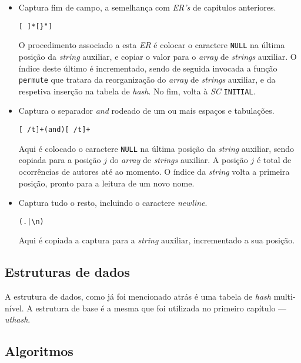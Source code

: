 \begin{itemize}
	\item Captura fim de campo, a semelhança com \emph{ER's} de capítulos
		anteriores.  

\begin{verbatim}
[ ]*[}"] 
\end{verbatim}

O procedimento associado a esta \emph{ER} é colocar o caractere \texttt{NULL}
na última posição da \emph{string} auxiliar, e copiar o valor para
o \emph{array} de \emph{strings} auxiliar. O índice deste último é incrementado,
sendo de seguida invocada a função \texttt{permute} que tratara da reorganização
do \emph{array} de \emph{strings} auxiliar, e da respetiva inserção na tabela de
\emph{hash}. No fim, volta à \emph{SC} \texttt{INITIAL}.  

\item Captura o separador \emph{and} rodeado de um ou mais espaços e tabulações.
\begin{verbatim}
[ /t]+(and)[ /t]+
\end{verbatim}

Aqui é colocado o caractere \texttt{NULL}  na última posição da \emph{string}
auxiliar, sendo copiada para a posição $j$ do \emph{array} de \emph{strings}
auxiliar.  A posição $j$ é total de ocorrências de autores até ao momento.
O índice da \emph{string} volta a primeira posição, pronto para a leitura de um
novo nome. 

\item Captura tudo o resto, incluindo o caractere \emph{newline}.  
\begin{verbatim}
(.|\n)
\end{verbatim}

Aqui é copiada a captura para a \emph{string} auxiliar, incrementado a sua
posição. 

\end{itemize}

\subsection{Estruturas de dados}

A estrutura de dados, como já foi mencionado atrás é uma tabela de \emph{hash}
multi-nível. A estrutura de base é a mesma que foi utilizada no primeiro
capítulo --- \emph{uthash}.  

\subsection{Algoritmos}

